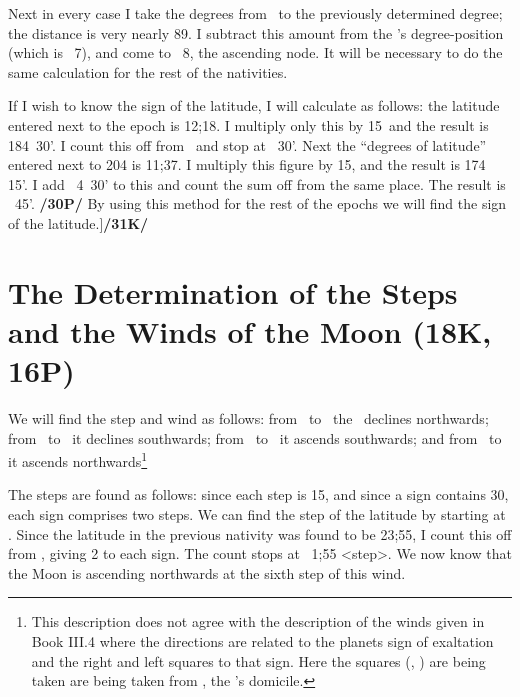 Next in every case I take the degrees from \Taurus\, to the previously determined degree; the distance is very nearly 89\deg. I subtract this amount from the \Moon’s degree-position (which is \Scorpio\, 7\deg), and come to \Leo\, 8\deg, the ascending node. It will be necessary to do the same calculation for the rest of the nativities.

If I wish to know the sign of the latitude, I will calculate as follows: the latitude entered next to the epoch is 12;18. I multiply only this by 15\deg\, and the result is 184\deg\, 30'. I count this off from \Leo\, and stop
at \deg\, 30'. Next the “degrees of latitude” entered next to 204 is 11;37. I multiply this figure by
15\deg, and the result is 174\deg\, 15'. I add \Aquarius\, 4\deg\, 30' to this and count the sum off from the same place. The result is \deg\, 45'. \textbf{/30P/} By using this method for the rest of the epochs we will find the sign of the latitude.]\textbf{/31K/}

\newpage
\section{The Determination of the Steps and the Winds of the Moon (18K, 16P)}
We will find the step and wind as follows: from \Leo\, to \Libra\, the \Moon\, declines northwards; from \Scorpio\, to \Capricorn\, it declines southwards; from \Aquarius\, to \Aries\, it ascends southwards; and from \Taurus\, to \Cancer\, it ascends northwards\footnote{This description does not agree with the description of the winds given in Book III.4 where the directions are related to the planets sign of exaltation and the right and left squares to that sign. Here the squares (\Libra, \Aries) are being taken  are being taken from \Cancer, the \Moon's domicile.}

The steps are found as follows: since each step is 15\deg, and since a sign contains 30\deg, each sign comprises two steps. We can find the step of the latitude by starting at \Leo. Since the latitude in the previous nativity was found to be 23;55, I count this off from \Leo, giving 2 to each sign. The count stops at \Cancer\, 1;55 <step>. We now know that the Moon is ascending northwards at the sixth step of this wind.

\newpage